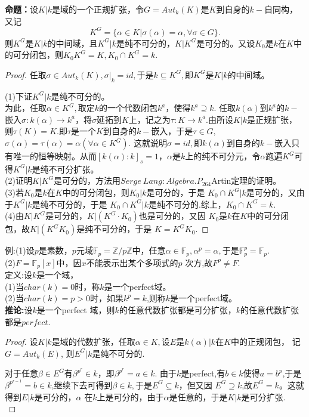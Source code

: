 \documentclass[UTF8]{article}
\begin{document}
\textbf{命题：}设$K|k$是域的一个正规扩张，令$G=Aut_{k}(K)$是$K$到自身的$k-$自同构，又记
$$
K^{G}=\{\alpha\in K|\sigma(\alpha)=\alpha,\forall \sigma \in G\}.
$$
则$K^{G}$是$K|k$的中间域，且$K^{G}|k$是纯不可分的，$K|K^{G}$是可分的。又设$K_{0}$是$k$在$K$中的可分闭包，则$K_{0}K^{G}=K,K_{0}\cap K^{G}=k.$\\
\begin{proof}
	任取$\sigma\in Aut_{k}(K),\sigma|_{k}=id,$于是$k\subseteq K^{G},$即$K^{G}$是$K|k$的中间域。
	
	
	(1)下证$K^{G}|k$是纯不可分的。\\
	为此，任取$\alpha\in K^{G},$取定$k$的一个代数闭包$k^{a}$，使得$k^{a}\supseteq k.$
	任取$k(\alpha)$到$k^{a}$的$k-$嵌入$\sigma:k(\alpha)\rightarrow k^{a}$，将$\sigma $延拓到$K$上，记之为$\tau:K\rightarrow k^{a}$.由所设$K|k$是正规扩张，则$\tau(K)=K.$即$\tau$是一个$K$到自身的$k-$嵌入，于是$\tau \in G,$ $\sigma(\alpha)=\tau(\alpha)=\alpha(\forall \alpha \in K^{G}).$
	这就说明$\sigma=id,$即$k(\alpha)$到自身的$k-$嵌入只有唯一的恒等映射。从而$[k(\alpha):k]_{s}=1$，$\alpha$是$k$上的纯不可分元，令$\alpha$跑遍$K^{G}$可得$K^{G}|k$是纯不可分扩张。\\
	(2)证明$K|K^{G}$是可分的，方法用$Serge\ Lang:Algebra.P_{264}$Artin定理的证明。\\
	(3)若$K_{0}$是$k$在$K$中的可分闭包，则$K_{0}|k$是可分的，于是
	$K_{0}\cap K^{G}|k$是可分的，又由于$K^{G}|k$是纯不可分的，于是
	$K_{0}\cap K^{G}|k$是纯不可分的.综上，$K_{0}\cap K^{G}=k.$\\
	(4)由$K|K^{G}$是可分的，$K|(K^{G}\cdot K_{0})$也是可分的，又因
	$K_{0}$是$k$在$K$中的可分闭包，故$K|(K^{G}K_{0})$是纯不可分的，于是
	$K=K^{G}K_{0}.$
\end{proof}
例:(1)设$p$是素数，$p$元域$\mathbb{F}_{p}=\mathbb{Z}/p\mathbb{Z}$中，任意$\alpha\in \mathbb{F}_{p},\alpha^{p}=\alpha,$于是$\mathbb{F}_{p}^{p}=\mathbb{F}_{p}.$\\
(2)$F=\mathbb{F}_{p}[x]$中，因$x$不能表示出某个多项式的$p$
次方,故$F^{p}\neq F.$\\

定义:设$k$是一个域，\\
(1)当$char(k)=0$时，称$k$是一个perfect域。\\
(2)当$char(k)=p>0$时，如果$k^{p}=k$,则称$k$是一个perfect域。\\
\textbf{推论:}设$k$是一个perfect 域，则$k$的任意代数扩张都是可分扩张，$k$的任意代数扩张都是$perfect.$\\
\begin{proof}
	
	
	设$K|k$是域的代数扩张，任取$\alpha\in K,$设$E$是$k(\alpha)|k$在$K$中的正规闭包，
	记$G=Aut_{k}(E)$,
	则$E^{G}|k$是纯不可分的.
	
	
	对于任意$\beta\in E^{G}$有$\beta^{p^{r}}\in k$，即$\beta^{p^{r}}=a\in k$.
	由于$k$是perfect,有$b\in k$使得$a=b^{p}$,于是$\beta^{p^{r-1}}=b\in k$,继续下去可得到$\beta \in k,$于是$E^{G}\subseteq k$，但又因
	$E^{G}\supseteq k$,故$E^{G}=k$。这就得到$E|k$是可分的，$\alpha$
	在$k$上是可分的，由于$\alpha$是任意的，于是$K|k$是可分扩张.\\
	
\end{proof}
\end{document}
